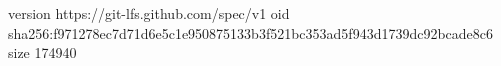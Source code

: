version https://git-lfs.github.com/spec/v1
oid sha256:f971278ec7d71d6e5c1e950875133b3f521bc353ad5f943d1739dc92bcade8c6
size 174940
